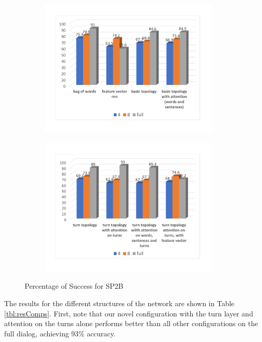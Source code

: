 \begin{figure}[]
    \hspace*{-0.8cm}
    \centering
    \begin{subfigure}[b]{0.5\columnwidth}
        \centering
        \includegraphics[trim=0cm 0.5cm 0cm 0cm, width=3.4in]{chart1}
    \end{subfigure}%
    \begin{subfigure}[b]{0.5\columnwidth}
        \centering
        \includegraphics[trim=0cm 0.5cm 0cm 0cm, width=3.4in]{chart2}
    \end{subfigure}
    \caption{Percentage of Success for SP2B}
    \label{graph:quality}
    \vspace{-4mm}
\end{figure}


The results for the different structures of the network are shown in Table \ref{tbl:resComps}. 
First, note that our novel configuration with the turn layer and attention on the turns alone 
performs better than all other configurations on the full dialog, 
achieving 93\% accuracy.

